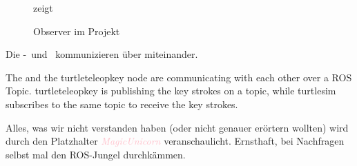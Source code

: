 


















\begin{figure}[ht!]
\vspace{0.25cm}
\begin{center}
\caption{Observer im Projekt}
\label{fig:Obs}
\end{center}

\vspace{0.25cm}
 zeigt \missing\
\end{figure}





Die \ROS-\Pub\ und \Sub\ kommunizieren über \Topic[s] miteinander. 





The  and the turtleteleopkey node are communicating with each other over a ROS Topic. 
turtleteleopkey is publishing the key strokes on a topic, while turtlesim subscribes to the same topic to receive the key strokes. 

Alles, was wir nicht verstanden haben (oder nicht genauer erörtern wollten) wird durch den Platzhalter \textcolor{pink}{\textit{MagicUnicorn}} veranschaulicht.
Ernsthaft, bei Nachfragen selbst mal den ROS-Jungel durchkämmen.